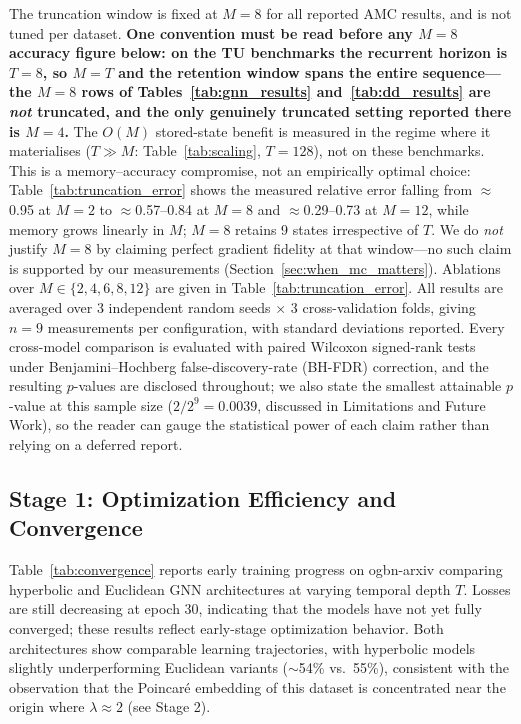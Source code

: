 \documentclass[a4paper,fleqn]{cas-dc}
\begin{document}
The truncation window is fixed at $M{=}8$ for all reported AMC results, and is not tuned per dataset. \textbf{One convention must be read before any $M{=}8$ accuracy figure below: on the TU benchmarks the recurrent horizon is $T{=}8$, so $M{=}T$ and the retention window spans the entire sequence---the $M{=}8$ rows of Tables~\ref{tab:gnn_results} and~\ref{tab:dd_results} are \emph{not} truncated, and the only genuinely truncated setting reported there is $M{=}4$.} The $O(M)$ stored-state benefit is measured in the regime where it materialises ($T \gg M$: Table~\ref{tab:scaling}, $T{=}128$), not on these benchmarks. This is a memory--accuracy compromise, not an empirically optimal choice: Table~\ref{tab:truncation_error} shows the measured relative error falling from $\approx$0.95 at $M{=}2$ to $\approx$0.57--0.84 at $M{=}8$ and $\approx$0.29--0.73 at $M{=}12$, while memory grows linearly in $M$; $M{=}8$ retains 9 states irrespective of $T$. We do \emph{not} justify $M{=}8$ by claiming perfect gradient fidelity at that window---no such claim is supported by our measurements (Section~\ref{sec:when_mc_matters}). Ablations over $M{\in}\{2,4,6,8,12\}$ are given in Table~\ref{tab:truncation_error}. All results are averaged over 3 independent random seeds $\times$ 3 cross-validation folds, giving $n{=}9$ measurements per configuration, with standard deviations reported. Every cross-model comparison is evaluated with paired Wilcoxon signed-rank tests under Benjamini--Hochberg false-discovery-rate (BH-FDR) correction, and the resulting $p$-values are disclosed throughout; we also state the smallest attainable $p$-value at this sample size ($2/2^{9}{=}0.0039$, discussed in Limitations and Future Work), so the reader can gauge the statistical power of each claim rather than relying on a deferred report.

\subsection{Stage 1: Optimization Efficiency and Convergence}

Table~\ref{tab:convergence} reports early training progress on ogbn-arxiv comparing hyperbolic and Euclidean GNN architectures at varying temporal depth $T$. Losses are still decreasing at epoch 30, indicating that the models have not yet fully converged; these results reflect early-stage optimization behavior. Both architectures show comparable learning trajectories, with hyperbolic models slightly underperforming Euclidean variants ($\sim$54\% vs.\ 55\%), consistent with the observation that the Poincar\'e embedding of this dataset is concentrated near the origin where $\lambda{\approx}2$ (see Stage 2).
\end{document}
